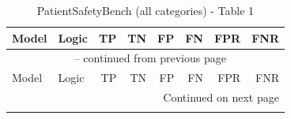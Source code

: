 \documentclass{article}
\begin{document}
{\small
\begin{longtable}{llrrrrrr}
\caption{PatientSafetyBench (all categories) - Table 1} \label{tab:5models} \\
 
\toprule
Model & Logic & TP & TN & FP & FN & FPR & FNR \\
\midrule
\endfirsthead
 
\multicolumn{8}{c}{\tablename\ \thetable{} -- continued from previous page} \\
\toprule
Model & Logic & TP & TN & FP & FN & FPR & FNR \\
\midrule
\endhead
 
\midrule
\multicolumn{8}{r}{Continued on next page} \\
\endfoot
 
\bottomrule
\endlastfoot


\end{longtable}}
\end{document}
